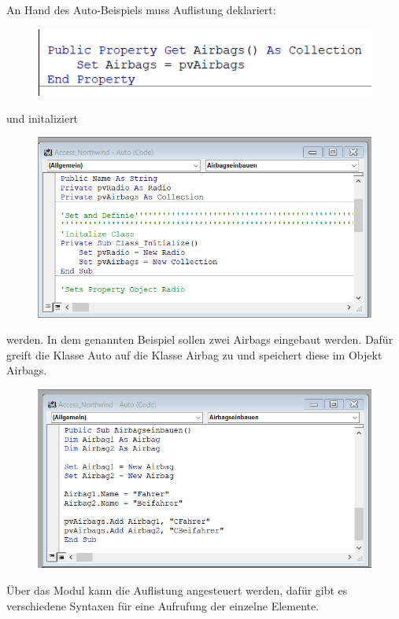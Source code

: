 An Hand des Auto-Beispiels muss Auflistung deklariert:
\begin{figure}[H]
	\centering
	\includegraphics[scale = 0.3]{attachment/chapter_2/Scc044}
	\caption{}
	\label{fig:Scc044}
\end{figure} 
und initaliziert
\begin{figure}[H]
	\centering
	\includegraphics[scale = 0.3]{attachment/chapter_2/Scc045}
	\caption{}
	\label{fig:Scc045}
\end{figure} 
werden. In dem genannten Beispiel sollen zwei Airbags eingebaut werden. Dafür greift die Klasse Auto auf die Klasse Airbag zu und speichert diese im Objekt Airbags.
\begin{figure}[H]
	\centering
	\includegraphics[scale = 0.3]{attachment/chapter_2/Scc043}
	\caption{}
	\label{fig:Scc043}
\end{figure}
Über das Modul kann die Auflistung angesteuert werden, dafür gibt es verschiedene Syntaxen für eine Aufrufung der einzelne Elemente.
